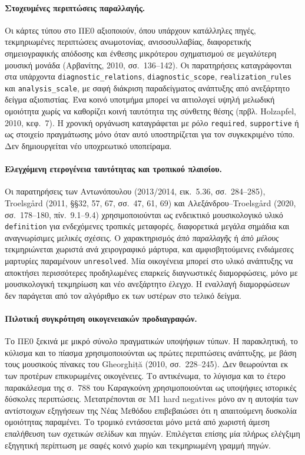 \documentclass[11pt,a4paper]{article}
\begin{document}
\paragraph{Στοχευμένες περιπτώσεις παραλλαγής.} Οι κάρτες τύπου στο ΠΕ0 αξιοποιούν, όπου υπάρχουν κατάλληλες πηγές, τεκμηριωμένες περιπτώσεις ανωμοτονίας, ανισοσυλλαβίας, διαφορετικής σημειογραφικής απόδοσης και ένθεσης μικρότερου σχηματισμού σε μεγαλύτερη μουσική μονάδα (Αρβανίτης, 2010, σσ.~136--142). Οι παρατηρήσεις καταγράφονται στα υπάρχοντα \texttt{diagnostic\_relations}, \texttt{diagnostic\_scope}, \texttt{realization\_rules} και \texttt{analysis\_scale}, με σαφή διάκριση παραδείγματος ανάπτυξης από ανεξάρτητο δείγμα αξιοπιστίας. Ένα κοινό υποτμήμα μπορεί να αιτιολογεί υψηλή μελωδική ομοιότητα χωρίς να καθορίζει κοινή ταυτότητα της σύνθετης θέσης (πρβλ. Holzapfel, 2010, κεφ.~7). Η χρονική οργάνωση καταγράφεται με ρόλο \texttt{required}, \texttt{supportive} ή ως στοιχείο πραγμάτωσης μόνο όταν αυτό υποστηρίζεται για τον συγκεκριμένο τύπο. Δεν δημιουργείται νέο υποχρεωτικό υποπείραμα.

\paragraph{Ελεγχόμενη ετερογένεια ταυτότητας και τροπικού πλαισίου.} Οι παρατηρήσεις των Αντωνόπουλου (2013/2014, εικ.~5.36, σσ.~284--285), Troelsgård (2011, §§32, 57, 67, σσ.~47, 61, 69) και Αλεξάνδρου--Troelsgård (2020, σσ.~178--180, πίν.~9.1--9.4) χρησιμοποιούνται ως ενδεικτικό μουσικολογικό υλικό \texttt{definition} για ενδεχόμενες τροπικές μεταφορές, διαφορετικά μεγάλα σημάδια και αναγνωρίσιμες μελικές σχέσεις. Ο χαρακτηρισμός \emph{ἀπὸ παραλλαγῆς} ή \emph{ἀπὸ μέλους} τεκμηριώνεται χωριστά ανά χειρογραφικό μάρτυρα, και αμφισβητούμενες ενδιάμεσες μαρτυρίες παραμένουν \texttt{unresolved}. Μία οικογένεια μπορεί στο υλικό ανάπτυξης να αποκτήσει περισσότερες προδηλωμένες επαρκείς διαγνωστικές διαμορφώσεις, μόνο με μουσικολογική τεκμηρίωση και νέο ανεξάρτητο έλεγχο. Η εναλλαγή διαμορφώσεων δεν παράγεται από τον αλγόριθμο εκ των υστέρων στο τελικό δείγμα.

\paragraph{Πιλοτική συγκρότηση οικογενειακών προδιαγραφών.}
Το ΠΕ0 ξεκινά με μικρό σύνολο πραγματικών υποψήφιων τύπων. Η παρακλητική, το κύλισμα και το πίασμα χρησιμοποιούνται ως πρώτες περιπτώσεις ανάπτυξης, με βάση τους μουσικούς πίνακες του Gheorghiță (2010, σσ.~228--245). Δεν θεωρούνται εκ των προτέρων επικυρωμένες οικογένειες. Το αντικένωμα, το λύγισμα και το έτερο παρακάλεσμα της σ.~788 του Καραγκούνη χρησιμοποιούνται ως υποψήφιες ιστορικές δύσκολες περιπτώσεις. Μετατρέπονται σε M1 hard negatives μόνο αν η αυτοψία των αντίστοιχων εξηγήσεων της Νέας Μεθόδου επιβεβαιώσει ότι η απαιτούμενη δυσκολία ομοιότητας παραμένει. Το τρομικό εντάσσεται μόνο μετά από χωριστή άμεση επαλήθευση των σχετικών σελίδων και πηγών. Επιλέγεται επίσης μία πλήρως ελέγξιμη εξηγητική περίπτωση με σαφές κοινό χωρίο και τεκμηριωμένη γραμμή πηγών.
\end{document}
